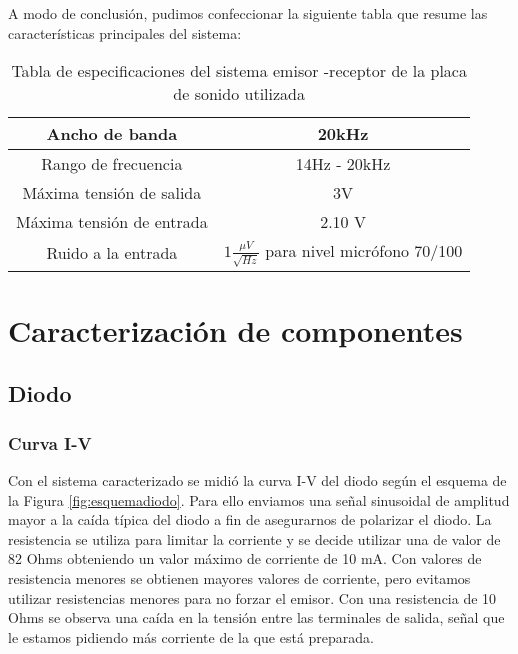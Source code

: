 \documentclass[a4paper, 11pt]{article}
\begin{document}
 A modo de conclusión, pudimos confeccionar la siguiente tabla que resume las características principales del sistema:
\begin {table}[H]
\begin {center}
 \begin{tabular} {|c|c|}
        \hline
        Ancho de banda & 20kHz \\
        \hline
        Rango de frecuencia & 14Hz - 20kHz\\
        \hline
        Máxima tensión de salida  & 3V\\
        \hline
        Máxima tensión de entrada  & 2.10 V\\
        \hline
        Ruido a la entrada & $1 \frac{\mu V}{\sqrt{Hz}}$ para nivel micrófono 70/100\\
        \hline
 \end{tabular}
 \caption{Tabla de especificaciones del sistema emisor -receptor de la placa de sonido utilizada}
 \label{table1}
 \end{center}
\end{table}

\section*{Caracterización de componentes}

\subsection*{Diodo}
\subsubsection*{Curva I-V}
Con el sistema caracterizado se midió la curva I-V del diodo según el esquema de la Figura \ref{fig:esquemadiodo}. Para ello enviamos una señal sinusoidal de amplitud mayor a la caída típica del diodo a fin de asegurarnos de polarizar el diodo. La resistencia se utiliza para limitar la corriente y se decide utilizar una de valor de 82 Ohms obteniendo un valor máximo de corriente de 10 mA. Con valores de resistencia menores se obtienen mayores valores de corriente, pero evitamos utilizar resistencias menores para no forzar el emisor. Con una resistencia de 10 Ohms se observa una caída en la tensión entre las terminales de salida, señal que le estamos pidiendo más corriente de la que está preparada.
\end{document}
